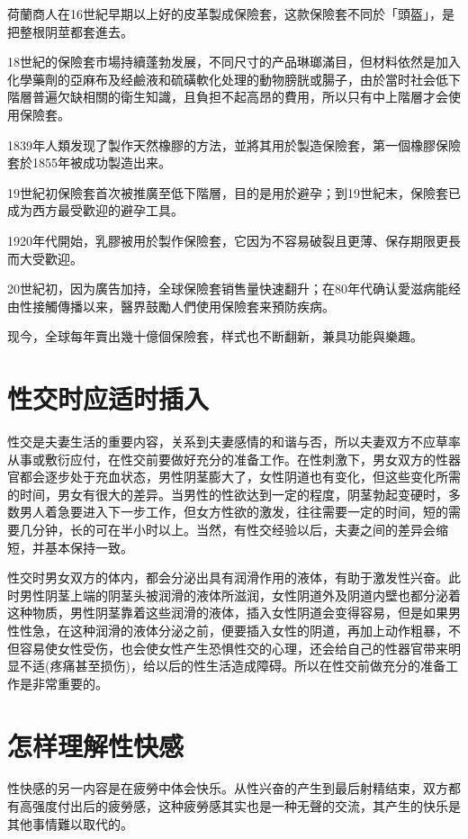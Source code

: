 \documentclass[12pt,UTF8]{ctexbook}
\begin{document}
荷蘭商人在16世紀早期以上好的皮革製成保險套，这款保險套不同於「頭盔」，是把整根阴莖都套進去。

18世紀的保險套市場持續蓬勃发展，不同尺寸的产品琳瑯滿目，但材料依然是加入化學藥劑的亞麻布及经鹼液和硫磺軟化处理的動物膀胱或腸子，由於當时社会低下階層普遍欠缺相關的衛生知識，且負担不起高昂的費用，所以只有中上階層才会使用保險套。

1839年人類发现了製作天然橡膠的方法，並將其用於製造保險套，第一個橡膠保險套於1855年被成功製造出来。

19世紀初保險套首次被推廣至低下階層，目的是用於避孕；到19世紀末，保險套已成为西方最受歡迎的避孕工具。

1920年代開始，乳膠被用於製作保險套，它因为不容易破裂且更薄、保存期限更長而大受歡迎。

20世紀初，因为廣告加持，全球保險套销售量快速翻升；在80年代确认愛滋病能经由性接觸傳播以来，醫界鼓勵人們使用保險套来預防疾病。

现今，全球每年賣出幾十億個保險套，样式也不断翻新，兼具功能與樂趣。



\section{性交时应适时插入}

性交是夫妻生活的重要内容，关系到夫妻感情的和谐与否，所以夫妻双方不应草率从事或敷衍应付，在性交前要做好充分的准备工作。在性刺激下，男女双方的性器官都会逐步处于充血状态，男性阴茎膨大了，女性阴道也有变化，但这些变化所需的时间，男女有很大的差异。当男性的性欲达到一定的程度，阴茎勃起变硬时，多数男人着急要进入下一步工作，但女方性欲的激发，往往需要一定的时间，短的需要几分钟，长的可在半小时以上。当然，有性交经验以后，夫妻之间的差异会缩短，并基本保持一致。

性交时男女双方的体内，都会分泌出具有润滑作用的液体，有助于激发性兴奋。此时男性阴茎上端的阴茎头被润滑的液体所滋润，女性阴道外及阴道内壁也都分泌着这种物质，男性阴茎靠着这些润滑的液体，插入女性阴道会变得容易，但是如果男性性急，在这种润滑的液体分泌之前，便要插入女性的阴道，再加上动作粗暴，不但容易使女性受伤，也会使女性产生恐惧性交的心理，还会给自己的性器官带来明显不适(疼痛甚至损伤)，给以后的性生活造成障碍。所以在性交前做充分的准备工作是非常重要的。

\section{怎样理解性快感}

性快感的另一内容是在疲勞中体会快乐。从性兴奋的产生到最后射精结束，双方都有高强度付出后的疲勞感，这种疲勞感其实也是一种无聲的交流，其产生的快乐是其他事情難以取代的。
\end{document}
